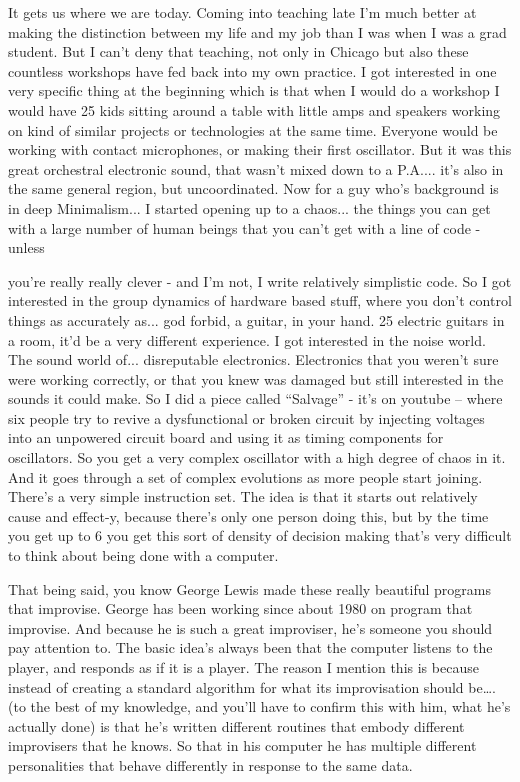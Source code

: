 It gets us where we are today. Coming into teaching late I’m much better at making the distinction between my life and my job than I was when I was a grad student. But I can’t deny that teaching, not only in Chicago but also these countless workshops have fed back into my own practice. I got interested in one very specific thing at the beginning which is that when I would do a workshop I would have 25 kids sitting around a table with little amps and speakers working on kind of similar projects or technologies at the same time. Everyone would be working with contact microphones, or making their first oscillator. But it was this great orchestral electronic sound, that wasn’t mixed down to a P.A.... it’s also in the same general region, but uncoordinated. Now for a guy who’s background is in deep Minimalism... I started opening up to a chaos... the things you can get with a large number of human beings that you can’t get with a line of code - unless
					
you’re really really clever - and I’m not, I write relatively simplistic code. So I got interested in the group dynamics of hardware based stuff, where you don’t control things as accurately as... god forbid, a guitar, in your hand. 25 electric guitars in a room, it’d be a very different experience. I got interested in the noise world. The sound world of... disreputable electronics. Electronics that you weren’t sure were working correctly, or that you knew was damaged but still interested in the sounds it could make.  So I did a piece called ``Salvage'' - it’s on youtube – where six people try to revive a dysfunctional or broken circuit by injecting voltages into an unpowered circuit board and using it as timing components for oscillators. So you get a very complex oscillator with a high degree of chaos in it. And it goes through a set of complex evolutions as more people start joining. There’s a very simple instruction set. The idea is that it starts out relatively cause and effect-y, because there’s only one person doing this, but by the time you get up to 6 you get this sort of density of decision making that’s very difficult to think about being done with a computer.
					
That being said, you know George Lewis made these really beautiful programs that improvise. George has been working since about 1980 on program that improvise. And because he is such a great improviser, he’s someone you should pay attention to. The basic idea’s always been that the computer listens to the player, and responds as if it is a player. The reason I mention this is because instead of creating a standard algorithm for what its improvisation should be…. (to the best of my knowledge, and you’ll have to confirm this with him, what he’s actually done) is that he’s written different routines that embody different improvisers that he knows. So that in his computer he has multiple different personalities that behave differently in response to the same data.
					
